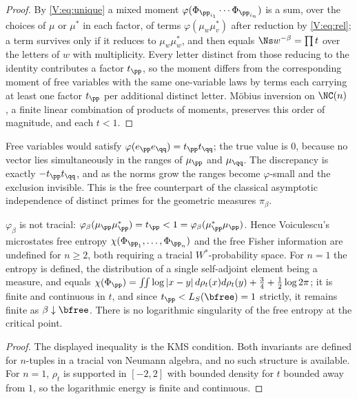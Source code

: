 \begin{proof}
By \eqref{V:eq:unique} a mixed moment $\varphi(\Phi_{\pp_{i_1}}\cdots\Phi_{\pp_{i_n}})$ is a sum,
over the choices of $\mu$ or $\mu^*$ in each factor, of terms $\varphi(\mu_w\mu_v^*)$ after
reduction by \eqref{V:eq:rel}; a term survives only if it reduces to $\mu_w\mu_w^*$, and then
equals $\Ns w^{-\beta}=\prod t$ over the letters of $w$ with multiplicity. Every letter
distinct from those reducing to the identity contributes a factor $t_\pp$, so the moment
differs from the corresponding moment of free variables with the same one-variable laws by
terms each carrying at least one factor $t_\pp$ per additional distinct letter. Möbius
inversion on $\NC(n)$ \cite{NS}, a finite linear combination of products of moments,
preserves this order of magnitude, and each $t<1$.
\end{proof}

\begin{remark}\label{V:rem:hardcore}
Free variables would satisfy $\varphi(e_\pp e_\qq)=t_\pp t_\qq$; the true value is $0$,
because no vector lies simultaneously in the ranges of $\mu_\pp$ and $\mu_\qq$. The
discrepancy is exactly $-t_\pp t_\qq$, and as the norms grow the ranges become
$\varphi$-small and the exclusion invisible. This is the free counterpart of the classical
asymptotic independence of distinct primes for the geometric measures $\pi_\beta$.
\end{remark}

\begin{theorem}\label{V:thm:nochi}
$\varphi_\beta$ is not tracial: $\varphi_\beta(\mu_\pp\mu_\pp^*)=t_\pp<1=\varphi_\beta(\mu_\pp^*\mu_\pp)$.
Hence Voiculescu's microstates free entropy $\chi(\Phi_{\pp_1},\dots,\Phi_{\pp_n})$
\cite{Voi94} and the free Fisher information are undefined for $n\ge2$, both requiring a
tracial $W^*$-probability space. For $n=1$ the entropy is defined, the distribution of a single
self-adjoint element being a measure, and equals
$\chi(\Phi_\pp)=\iint\log|x-y|\,d\rho_t(x)d\rho_t(y)+\tfrac34+\tfrac12\log2\pi$; it is finite
and continuous in $t$, and since $t_\pp<L_S(\bfree)=1$ strictly, it remains finite as
$\beta\downarrow\bfree$. There is no logarithmic singularity of the free entropy at the
critical point.
\end{theorem}

\begin{proof}
The displayed inequality is the KMS condition. Both invariants are defined for $n$-tuples in
a tracial von Neumann algebra, and no such structure is available. For $n=1$, $\rho_t$ is
supported in $[-2,2]$ with bounded density for $t$ bounded away from $1$, so the logarithmic
energy is finite and continuous.
\end{proof}

